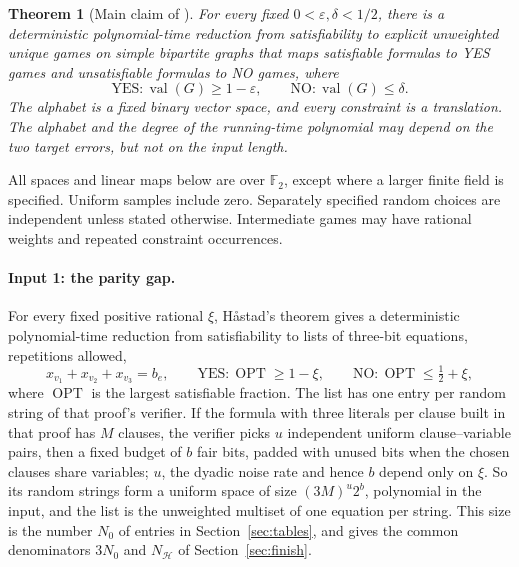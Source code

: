 \documentclass[11pt]{article}
\newtheorem{theorem}{Theorem}
\newcommand{\F}{\mathbb F}
\newcommand{\eps}{\varepsilon}
\newcommand{\val}{\operatorname{val}}
\newcommand{\OPT}{\operatorname{OPT}}
\begin{document}
\begin{theorem}[Main claim of \cite{UGT}]\label{thm:main}
For every fixed $0<\eps,\delta<1/2$, there is a deterministic polynomial-time
reduction from satisfiability to explicit unweighted unique games on
simple bipartite graphs that maps satisfiable formulas to YES games and
unsatisfiable formulas to NO games, where
\[
 \mathrm{YES}:\val(G)\ge1-\eps,
 \qquad \mathrm{NO}:\val(G)\le\delta.
\]
The alphabet is a fixed binary vector space, and every constraint is a
translation. The alphabet and the degree of the running-time polynomial
may depend on the two target errors, but not on the input length.
\end{theorem}

All spaces and linear maps below are over $\F_2$, except where a larger
finite field is specified. Uniform samples include zero. Separately
specified random choices are independent unless stated otherwise.
Intermediate games may have rational weights and repeated constraint
occurrences.

\paragraph{Input 1: the parity gap.}
For every fixed positive rational $\xi$, H\aa stad's theorem
\cite[Theorem 5.4 and its proof]{Hastad} gives a deterministic polynomial-time reduction
from satisfiability to lists of three-bit equations, repetitions allowed,
\[
 x_{v_1}+x_{v_2}+x_{v_3}=b_e,
 \qquad \mathrm{YES}:\OPT\ge1-\xi,
 \qquad \mathrm{NO}:\OPT\le\tfrac12+\xi,
\]
where $\OPT$ is the largest satisfiable fraction. The list has one entry
per random string of that proof's verifier. If the formula with three
literals per clause built in that proof has $M$ clauses, the verifier picks
$u$ independent uniform clause--variable pairs, then a fixed budget of $b$
fair bits, padded with unused bits when the chosen clauses share variables;
$u$, the dyadic noise rate and hence $b$ depend only on $\xi$. So its random
strings form a uniform space of size $(3M)^u2^b$, polynomial in the input,
and the list is the unweighted multiset of one equation per string. This
size is the number $N_0$ of entries in Section~\ref{sec:tables}, and gives
the common denominators $3N_0$ and $N_{\mathcal H}$ of
Section~\ref{sec:finish}.
\end{document}
